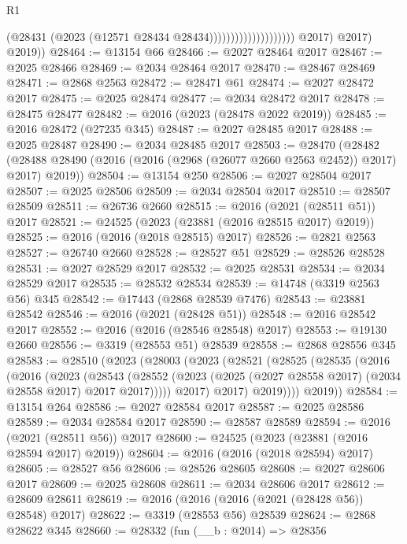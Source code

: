 \begin{lexlean}{R1}
\begin{coremodule}
                                              (@28431
                                                (@2023 (@12571 @28434 @28434))))))))))))))))))))
            @2017)
          @2017)
        @2019))
@28464 := @13154 @66
@28466 := @2027 @28464 @2017
@28467 := @2025 @28466
@28469 := @2034 @28464 @2017
@28470 := @28467 @28469
@28471 := @2868 @2563
@28472 := @28471 @61
@28474 := @2027 @28472 @2017
@28475 := @2025 @28474
@28477 := @2034 @28472 @2017
@28478 := @28475 @28477
@28482 := @2016 (@2023 (@28478 @2022 @2019))
@28485 := @2016 @28472 (@27235 @345)
@28487 := @2027 @28485 @2017
@28488 := @2025 @28487
@28490 := @2034 @28485 @2017
@28503 := @28470
    (@28482 (@28488 @28490 (@2016 (@2016 (@2968 (@26077 @2660 @2563 @2452)) @2017) @2017) @2019))
@28504 := @13154 @250
@28506 := @2027 @28504 @2017
@28507 := @2025 @28506
@28509 := @2034 @28504 @2017
@28510 := @28507 @28509
@28511 := @26736 @2660
@28515 := @2016 (@2021 (@28511 @51)) @2017
@28521 := @24525 (@2023 (@23881 (@2016 @28515 @2017) @2019))
@28525 := @2016 (@2016 (@2018 @28515) @2017)
@28526 := @2821 @2563
@28527 := @26740 @2660
@28528 := @28527 @51
@28529 := @28526 @28528
@28531 := @2027 @28529 @2017
@28532 := @2025 @28531
@28534 := @2034 @28529 @2017
@28535 := @28532 @28534
@28539 := @14748 (@3319 @2563 @56) @345
@28542 := @17443 (@2868 @28539 @7476)
@28543 := @23881 @28542
@28546 := @2016 (@2021 (@28428 @51))
@28548 := @2016 @28542 @2017
@28552 := @2016 (@2016 (@28546 @28548) @2017)
@28553 := @19130 @2660
@28556 := @3319 (@28553 @51) @28539
@28558 := @2868 @28556 @345
@28583 := @28510
    (@2023
      (@28003
        (@2023
          (@28521
            (@28525
              (@28535
                (@2016
                  (@2016
                    (@2023
                      (@28543
                        (@28552
                          (@2023 (@2025 (@2027 @28558 @2017) (@2034 @28558 @2017) @2017 @2017)))))
                    @2017)
                  @2017)
                @2019))))
        @2019))
@28584 := @13154 @264
@28586 := @2027 @28584 @2017
@28587 := @2025 @28586
@28589 := @2034 @28584 @2017
@28590 := @28587 @28589
@28594 := @2016 (@2021 (@28511 @56)) @2017
@28600 := @24525 (@2023 (@23881 (@2016 @28594 @2017) @2019))
@28604 := @2016 (@2016 (@2018 @28594) @2017)
@28605 := @28527 @56
@28606 := @28526 @28605
@28608 := @2027 @28606 @2017
@28609 := @2025 @28608
@28611 := @2034 @28606 @2017
@28612 := @28609 @28611
@28619 := @2016 (@2016 (@2016 (@2021 (@28428 @56)) @28548) @2017)
@28622 := @3319 (@28553 @56) @28539
@28624 := @2868 @28622 @345
@28660 := @28332
    (fun (__b : @2014) =>
    @28356

\end{coremodule}
\end{lexlean}
